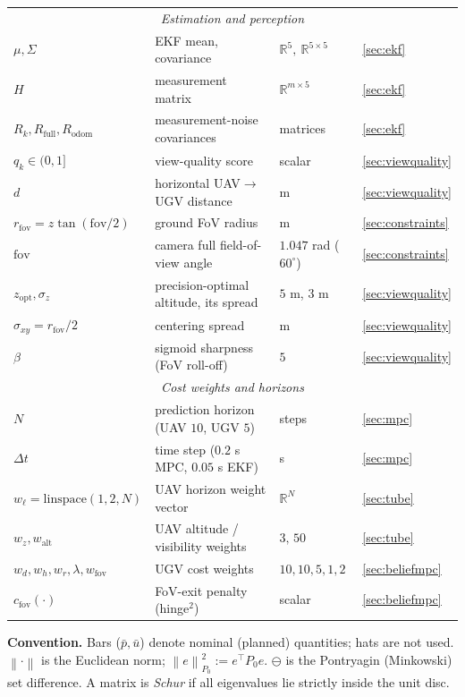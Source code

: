 \documentclass[11pt]{article}
\newcommand{\R}{\mathbb{R}}
\newcommand{\norm}[1]{\left\lVert #1 \right\rVert}
\newcommand{\bu}{\bar{u}}
\newcommand{\bp}{\bar{p}}
\newcommand{\fov}{\mathrm{fov}}
\newcommand{\opt}{\mathrm{opt}}
\begin{document}
{\begin{longtable}{@{}l l l l@{}}
\midrule
\multicolumn{4}{c}{\emph{Estimation and perception}} \\
$\mu,\Sigma$ & EKF mean, covariance & $\R^5,\ \R^{5\times5}$ & \cref{sec:ekf} \\
$H$ & measurement matrix & $\R^{m\times5}$ & \cref{sec:ekf} \\
$R_k,R_{\text{full}},R_{\text{odom}}$ & measurement-noise covariances & matrices & \cref{sec:ekf} \\
$q_k\in(0,1]$ & view-quality score & scalar & \cref{sec:viewquality} \\
$d$ & horizontal UAV$\to$UGV distance & m & \cref{sec:viewquality} \\
$r_{\fov}=z\tan(\fov/2)$ & ground FoV radius & m & \cref{sec:constraints} \\
$\fov$ & camera full field-of-view angle & $1.047$ rad ($60^\circ$) & \cref{sec:constraints} \\
$z_\opt,\sigma_z$ & precision-optimal altitude, its spread & $5$ m, $3$ m & \cref{sec:viewquality} \\
$\sigma_{xy}=r_{\fov}/2$ & centering spread & m & \cref{sec:viewquality} \\
$\beta$ & sigmoid sharpness (FoV roll-off) & $5$ & \cref{sec:viewquality} \\
\midrule
\multicolumn{4}{c}{\emph{Cost weights and horizons}} \\
$N$ & prediction horizon (UAV $10$, UGV $5$) & steps & \cref{sec:mpc} \\
$\Delta t$ & time step ($0.2$ s MPC, $0.05$ s EKF) & s & \cref{sec:mpc} \\
$w_\ell=\mathrm{linspace}(1,2,N)$ & UAV horizon weight vector & $\R^N$ & \cref{sec:tube} \\
$w_z,w_{\text{alt}}$ & UAV altitude / visibility weights & $3,\,50$ & \cref{sec:tube} \\
$w_d,w_h,w_r,\lambda,w_{\fov}$ & UGV cost weights & $10,10,5,1,2$ & \cref{sec:beliefmpc} \\
$c_{\fov}(\cdot)$ & FoV-exit penalty (hinge$^2$) & scalar & \cref{sec:beliefmpc} \\
\bottomrule
\end{longtable}
}

\noindent\textbf{Convention.} Bars ($\bp,\bu$) denote nominal (planned) quantities; hats are not used.
$\norm{\cdot}$ is the Euclidean norm; $\norm{e}_{P_0}^2 := e^\top P_0 e$. $\ominus$ is the Pontryagin
(Minkowski) set difference. A matrix is \emph{Schur} if all eigenvalues lie strictly inside the unit disc.
\end{document}
